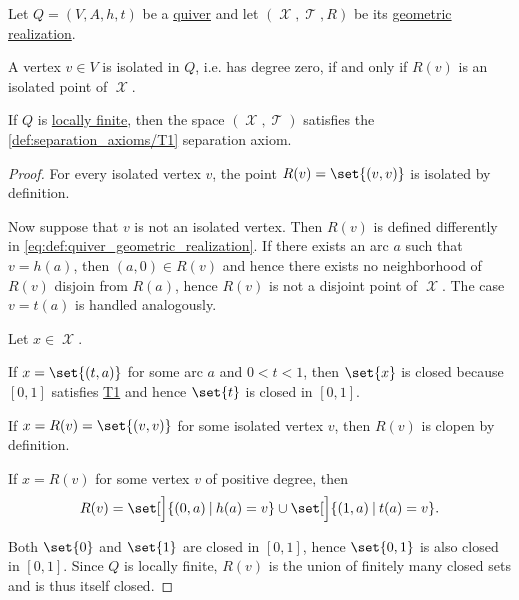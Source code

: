 \begin{proposition}\label{thm:def:quiver_geometric_realization/properties}
  Let \( Q = (V, A, h, t) \) be a \hyperref[def:quiver]{quiver} and let \( (\mscrX, \mscrT, R) \) be its \hyperref[def:quiver_geometric_realization]{geometric realization}.

  \begin{thmenum}
     A vertex \( v \in V \) is isolated in \( Q \), i.e. has degree zero, if and only if \( R(v) \) is an isolated point of \( \mscrX \).

     If \( Q \) is \hyperref[def:hypergraph/degree]{locally finite}, then the space \( (\mscrX, \mscrT) \) satisfies the \ref{def:separation_axioms/T1} separation axiom.
  \end{thmenum}
\end{proposition}
\begin{proof}
   For every isolated vertex \( v \), the point \( R(v) = \set{ (v, v) } \) is isolated by definition.

  Now suppose that \( v \) is not an isolated vertex. Then \( R(v) \) is defined differently in \eqref{eq:def:quiver_geometric_realization}. If there exists an arc \( a \) such that \( v = h(a) \), then \( (a, 0) \in R(v) \) and hence there exists no neighborhood of \( R(v) \) disjoin from \( R(a) \), hence \( R(v) \) is not a disjoint point of \( \mscrX \). The case \( v = t(a) \) is handled analogously.

   Let \( x \in \mscrX \).

  If \( x = \set{ (t, a) } \) for some arc \( a \) and \( 0 < t < 1 \), then \( \set{ x } \) is closed because \( [0, 1] \) satisfies \hyperref[def:separation_axioms/T1]{T1} and hence \( \set{ t } \) is closed in \( [0, 1] \).

  If \( x = R(v) = \set{ (v, v) } \) for some isolated vertex \( v \), then \( R(v) \) is clopen by definition.

  If \( x = R(v) \) for some vertex \( v \) of positive degree, then
  \begin{equation*}
    R(v) = \set[\Big]{ (0, a) \given h(a) = v } \cup \set[\Big]{ (1, a) \given t(a) = v }.
  \end{equation*}

  Both \( \set{ 0 } \) and \( \set{ 1 } \) are closed in \( [0, 1] \), hence \( \set{ 0, 1 } \) is also closed in \( [0, 1] \). Since \( Q \) is locally finite, \( R(v) \) is the union of finitely many closed sets and is thus itself closed.
\end{proof}


